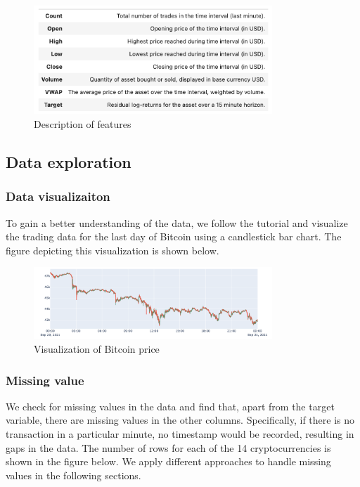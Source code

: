 \documentclass{article}
\begin{document}
\begin{figure}[H]
	\centering
	\includegraphics[width=0.8\textwidth]{Data/Feature Description.png}
	\caption{Description of features}
\end{figure}

\subsection{Data exploration}

\subsubsection{Data visualizaiton}
To gain a better understanding of the data, we follow the tutorial and visualize the trading data for the last day of Bitcoin using a candlestick bar chart. The figure depicting this visualization is shown below.

\begin{figure}[H]
	\centering
	\includegraphics[width=0.8\textwidth]{Data/Visualization of Bitcoin price.png}
	\caption{Visualization of Bitcoin price}
\end{figure}

\subsubsection{Missing value}
We check for missing values in the data and find that, apart from the target variable, there are missing values in the other columns. Specifically, if there is no transaction in a particular minute, no timestamp would be recorded, resulting in gaps in the data. The number of rows for each of the 14 cryptocurrencies is shown in the figure below. We apply different approaches to handle missing values in the following sections.
\end{document}
